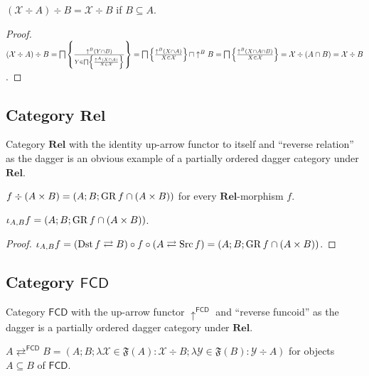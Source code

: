 \begin{prop}
  $(\mathcal{X} \div A) \div B = \mathcal{X} \div B$ if $B \subseteq A$.
\end{prop}

\begin{proof}
  $(\mathcal{X} \div A) \div B = \bigsqcap \left\{ \frac{ \uparrow^B  (Y \cap B)
  }{ Y \in \bigsqcap \left\{ \frac{ \uparrow^A  (X \cap A)}{X \in \mathcal{X} }\right\} \mathcal{} }\right\} =
  \bigsqcap \left\{ \frac{ \uparrow^B  (X \cap A) }{ X \in
  \mathcal{X} }\right\} \sqcap \uparrow^B B = \bigsqcap \left\{ \frac{ \uparrow^B  (X
  \cap A \cap B) }{ X \in \mathcal{X} }\right\} =
  \mathcal{X} \div (A \cap B) = \mathcal{X} \div B$.
\end{proof}

\subsection{\texorpdfstring{Category $\mathbf{Rel}$}{Category Rel}}

Category $\mathbf{Rel}$ with the identity up-arrow functor to itself
and ``reverse relation'' as the dagger is an obvious example of a partially
ordered dagger category under $\mathbf{Rel}$.

\begin{defn}
  $f \div (A \times B) = (A ; B ; \operatorname{GR} f \cap (A \times B))$ for every
  $\mathbf{Rel}$-morphism $f$.
\end{defn}

\begin{prop}
  $\iota_{A, B} f = (A ; B ; \operatorname{GR} f \cap (A \times B))$.
\end{prop}

\begin{proof}
  $\iota_{A, B} f = (\operatorname{Dst} f \rightleftarrows B) \circ f \circ (A
  \rightleftarrows \operatorname{Src} f) = (A ; B ; \operatorname{GR} f \cap (A \times B))$.
\end{proof}

\subsection{\texorpdfstring{Category $\mathsf{FCD}$}{Category FCD}}

Category $\mathsf{FCD}$ with the up-arrow functor
$\uparrow^{\mathsf{FCD}}$ and ``reverse funcoid'' as the dagger is a
partially ordered dagger category under $\mathbf{Rel}$.

\begin{prop}
  $A \rightleftarrows^{\mathsf{FCD}} B = (A ; B ; \lambda \mathcal{X}
  \in \mathfrak{F} (A) : \mathcal{X} \div B ; \lambda \mathcal{Y} \in
  \mathfrak{F} (B) : \mathcal{Y} \div A)$ for objects $A \subseteq B$ of
  $\mathsf{FCD}$.
\end{prop}


